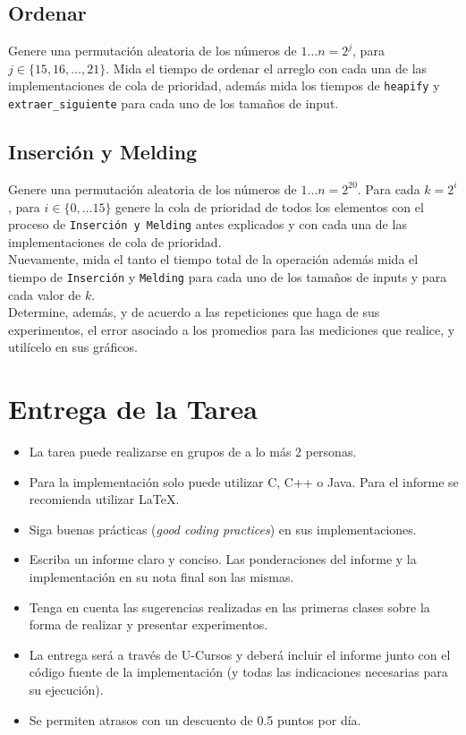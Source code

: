 \documentclass[dcc,uchile]{fcfmcourse}
\begin{document}
\subsection*{Ordenar}
Genere una permutación aleatoria de los números de $1 \ldots n = 2^j$, para $j\in \{15, 16,\ldots, 21\}$. Mida el tiempo de ordenar el arreglo con cada una de las implementaciones de cola de prioridad, además mida los tiempos de \texttt{heapify} y \texttt{extraer\_siguiente} para cada uno de los tamaños de input.

\subsection*{Inserción y Melding}
Genere una permutación aleatoria de los números de $1 \ldots n = 2^{20}$. Para cada $k = 2^i$, para $i\in \{0, \ldots 15\}$ genere la cola de prioridad de todos los elementos con el proceso de \texttt{Inserción y Melding} antes explicados y con cada una de las implementaciones de cola de prioridad.\\ Nuevamente, mida el tanto el tiempo total de la operación además mida el tiempo de \texttt{Inserción} y \texttt{Melding} para cada uno de los tamaños de inputs y para cada valor de $k$.\\



Determine, además, y de acuerdo a las repeticiones que haga de sus experimentos, el error asociado a los promedios para las mediciones que realice, y utilícelo en sus gráficos.

\section{Entrega de la Tarea}
\begin{itemize}
    \item La tarea puede realizarse en grupos de a lo más 2 personas.
    \item Para la implementación solo puede utilizar C, C++ o Java. Para el informe se recomienda utilizar \LaTeX .
    \item Siga buenas prácticas (\textit{good coding practices}) en sus implementaciones.
    \item Escriba un informe claro y conciso. Las ponderaciones del informe y la implementación en su nota final son las mismas.
    \item Tenga en cuenta las sugerencias realizadas en las primeras clases sobre la forma de realizar y presentar experimentos.
    \item La entrega será a través de U-Cursos y deberá incluir el informe junto con el código fuente de la implementación (y todas las indicaciones necesarias para su ejecución).
    \item Se permiten atrasos con un descuento de 0.5 puntos por día.
\end{itemize}
\end{document}
